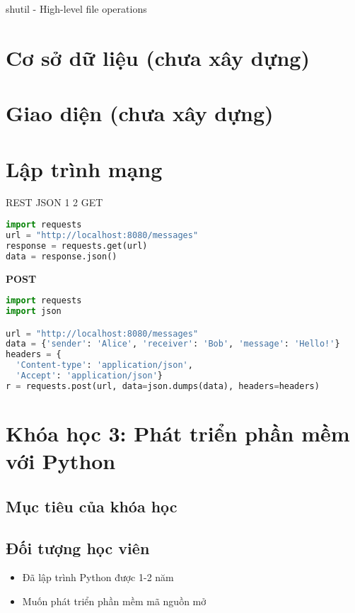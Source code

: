 shutil - High-level file operations

\section{Cơ sở dữ liệu (chưa xây dựng)}

\section{Giao diện (chưa xây dựng)}

\section{Lập trình mạng}


REST
JSON 1 2
GET

\begin{lstlisting}[language=Python]
import requests
url = "http://localhost:8080/messages"
response = requests.get(url)
data = response.json()
\end{lstlisting}

\textbf{POST}

\begin{lstlisting}[language=Python]
import requests
import json

url = "http://localhost:8080/messages"
data = {'sender': 'Alice', 'receiver': 'Bob', 'message': 'Hello!'}
headers = {
  'Content-type': 'application/json',
  'Accept': 'application/json'}
r = requests.post(url, data=json.dumps(data), headers=headers)
\end{lstlisting}

\section{Khóa học 3: Phát triển phần mềm với Python}

\subsection{Mục tiêu của khóa học}

\subsection{Đối tượng học viên}

\begin{itemize}
  \item Đã lập trình Python được 1-2 năm
  \item Muốn phát triển phần mềm mã nguồn mở
\end{itemize}

